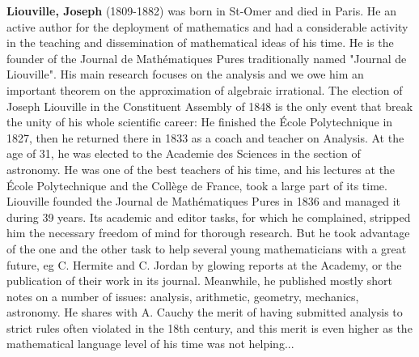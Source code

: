 \textbf{Liouville, Joseph} (1809-1882) was born in St-Omer and died in Paris. He an active author for the deployment of mathematics and had a considerable activity in the teaching and dissemination of mathematical ideas of his time. He is the founder of the Journal de Mathématiques Pures traditionally named "Journal de Liouville". His main research focuses on the analysis and we owe him an important theorem on the approximation of algebraic irrational. The election of Joseph Liouville in the Constituent Assembly of 1848 is the only event that break the unity of his whole scientific career: He finished the École Polytechnique in 1827, then he returned there in 1833 as a coach and teacher on Analysis. At the age of 31, he was elected to the Academie des Sciences in the section of astronomy. He was one of the best teachers of his time, and his lectures at the École Polytechnique and the Collège de France, took a large part of its time. Liouville founded the Journal de Mathématiques Pures in 1836 and managed it during 39 years. Its academic and editor tasks, for which he complained, stripped him the necessary freedom of mind for thorough research. But he took advantage of the one and the other task to help several young mathematicians with a great future, eg C. Hermite and C. Jordan by glowing reports at the Academy, or the publication of their work in its journal. Meanwhile, he published mostly short notes on a number of issues: analysis, arithmetic, geometry, mechanics, astronomy. He shares with A. Cauchy the merit of having submitted analysis to strict rules often violated in the 18th century, and this merit is even higher as the mathematical language level of his time was not helping...

